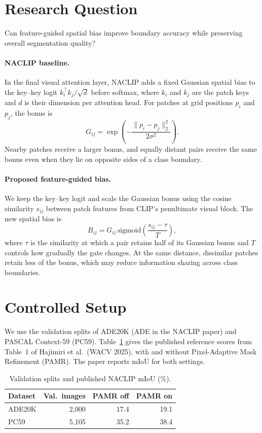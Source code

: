 \section{Research Question}
Can feature-guided spatial bias improve boundary accuracy while preserving
overall segmentation quality?

\paragraph{NACLIP baseline.}
In the final visual attention layer, NACLIP adds a fixed Gaussian spatial bias
to the key--key logit $k_i^\top k_j/\sqrt{d}$ before softmax, where $k_i$ and
$k_j$ are the patch keys and $d$ is their dimension per attention head. For
patches at grid positions $p_i$ and $p_j$, the bonus is
\[
    G_{ij} = \exp\!\left(-\frac{\|p_i-p_j\|_2^2}{2\sigma^2}\right).
\]
Nearby patches receive a larger bonus, and equally distant pairs receive the
same bonus even when they lie on opposite sides of a class boundary.

\paragraph{Proposed feature-guided bias.}
We keep the key--key logit and scale the Gaussian bonus using the cosine
similarity $s_{ij}$ between patch features from CLIP's penultimate visual block.
The new spatial bias is
\[
    B_{ij} = G_{ij}\,\mathrm{sigmoid}\!\left(\frac{s_{ij}-\tau}{T}\right),
\]
where $\tau$ is the similarity at which a pair retains half of its Gaussian
bonus and $T$ controls how gradually the gate changes. At the same distance,
dissimilar patches retain less of the bonus, which may reduce information
sharing across class boundaries.

\section{Controlled Setup}
We use the validation splits of ADE20K (ADE in the NACLIP paper) and PASCAL
Context-59 (PC59). Table~\ref{tab:naclip-reported-miou} gives the published
reference scores from Table~1 of Hajimiri et al.\ (WACV 2025), with and without
Pixel-Adaptive Mask Refinement (PAMR). The paper reports mIoU for both settings.

\begin{table}[htbp]
    \centering
    \caption{Validation splits and published NACLIP mIoU (\%).}
    \label{tab:naclip-reported-miou}
    \begin{tabular}{lrrr}
        \hline
        Dataset & Val.\ images & PAMR off & PAMR on \\
        \hline
        ADE20K & 2,000 & 17.4 & 19.1 \\
        PC59   & 5,105 & 35.2 & 38.4 \\
        \hline
    \end{tabular}
\end{table}

